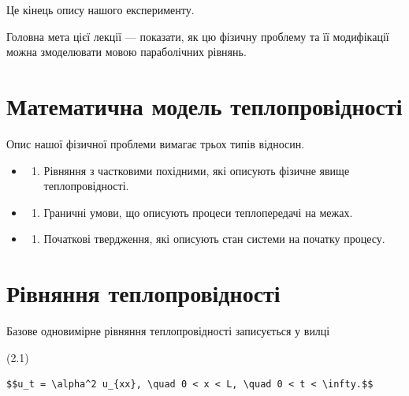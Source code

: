 \documentclass[
  ukrainian,
]{article}
\providecommand{\tightlist}{%
  \setlength{\itemsep}{0pt}\setlength{\parskip}{0pt}}
\begin{document}
Це кінець опису нашого експерименту.

Головна мета цієї лекції --- показати, як цю фізичну проблему та її
модифікації можна змоделювати мовою параболічних рівнянь.

\section{Математична модель
теплопровідності}\label{ux43cux430ux442ux435ux43cux430ux442ux438ux447ux43dux430-ux43cux43eux434ux435ux43bux44c-ux442ux435ux43fux43bux43eux43fux440ux43eux432ux456ux434ux43dux43eux441ux442ux456}

Опис нашої фізичної проблеми вимагає трьох типів відносин.

\begin{itemize}
\tightlist
\item
  \begin{enumerate}
  \def\labelenumi{\arabic{enumi}.}
  \tightlist
  \item
    Рівняння з частковими похідними, які описують фізичне явище
    теплопровідності.
  \end{enumerate}
\item
  \begin{enumerate}
  \def\labelenumi{\arabic{enumi}.}
  \setcounter{enumi}{1}
  \tightlist
  \item
    Граничні умови, що описують процеси теплопередачі на межах.
  \end{enumerate}
\item
  \begin{enumerate}
  \def\labelenumi{\arabic{enumi}.}
  \setcounter{enumi}{2}
  \tightlist
  \item
    Початкові твердження, які описують стан системи на початку процесу.
  \end{enumerate}
\end{itemize}

\section{Рівняння
теплопровідності}\label{ux440ux456ux432ux43dux44fux43dux43dux44f-ux442ux435ux43fux43bux43eux43fux440ux43eux432ux456ux434ux43dux43eux441ux442ux456}

Базове одновимірне рівняння теплопровідності записується у вилці

(2.1)

\begin{verbatim}
$$u_t = \alpha^2 u_{xx}, \quad 0 < x < L, \quad 0 < t < \infty.$$
\end{verbatim}
\end{document}
